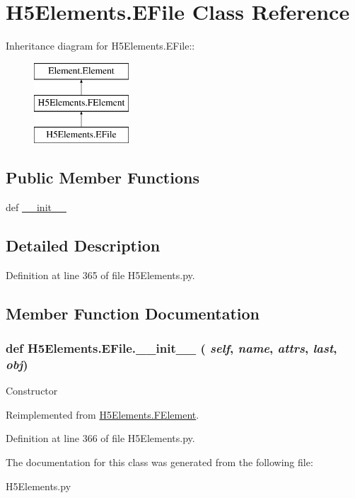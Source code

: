 \hypertarget{classH5Elements_1_1EFile}{
\section{H5Elements.EFile Class Reference}
\label{classH5Elements_1_1EFile}
}
Inheritance diagram for H5Elements.EFile::\begin{figure}[H]
\begin{center}
\leavevmode
\includegraphics[height=3cm]{classH5Elements_1_1EFile}
\end{center}
\end{figure}
\subsection*{Public Member Functions}
\begin{DoxyCompactItemize}
\item 
def \hyperlink{classH5Elements_1_1EFile_a8583b07993d4f52b537bb202bdb39863}{\_\-\_\-init\_\-\_\-}
\end{DoxyCompactItemize}


\subsection{Detailed Description}


Definition at line 365 of file H5Elements.py.

\subsection{Member Function Documentation}
\hypertarget{classH5Elements_1_1EFile_a8583b07993d4f52b537bb202bdb39863}{
\subsubsection[{\_\-\_\-init\_\-\_\-}]{\setlength{\rightskip}{0pt plus 5cm}def H5Elements.EFile.\_\-\_\-init\_\-\_\- ( {\em self}, \/   {\em name}, \/   {\em attrs}, \/   {\em last}, \/   {\em obj})}}
\label{classH5Elements_1_1EFile_a8583b07993d4f52b537bb202bdb39863}
\begin{DoxyVerb}Constructor \end{DoxyVerb}
 

Reimplemented from \hyperlink{classH5Elements_1_1FElement_ac013d152339bec50771f059a62e764c7}{H5Elements.FElement}.

Definition at line 366 of file H5Elements.py.

The documentation for this class was generated from the following file:\begin{DoxyCompactItemize}
\item 
H5Elements.py\end{DoxyCompactItemize}
